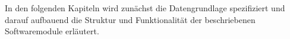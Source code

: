 
In den folgenden Kapiteln wird zunächst die Datengrundlage spezifiziert und darauf aufbauend die Struktur und Funktionalität der beschriebenen Softwaremodule erläutert.



\prever{
}




\prever{
}
